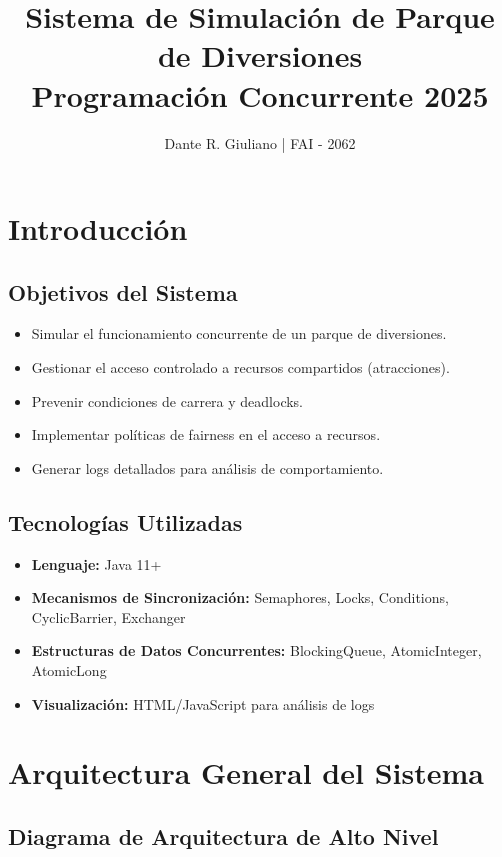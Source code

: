 \documentclass[12pt,a4paper]{article}
\title{\textbf{Sistema de Simulación de Parque de Diversiones }\\
\large Programación Concurrente 2025}
\author{Dante R. Giuliano | FAI - 2062}
\begin{document}
\maketitle
\newpage

\tableofcontents
\newpage

\section{Introducción}

\subsection{Objetivos del Sistema}
\begin{itemize}
    \item Simular el funcionamiento concurrente de un parque de diversiones.
    \item Gestionar el acceso controlado a recursos compartidos (atracciones).
    \item Prevenir condiciones de carrera y deadlocks.
    \item Implementar políticas de fairness en el acceso a recursos.
    \item Generar logs detallados para análisis de comportamiento.
\end{itemize}

\subsection{Tecnologías Utilizadas}
\begin{itemize}
    \item \textbf{Lenguaje:} Java 11+
    \item \textbf{Mecanismos de Sincronización:} Semaphores, Locks, Conditions, CyclicBarrier, Exchanger
    \item \textbf{Estructuras de Datos Concurrentes:} BlockingQueue, AtomicInteger, AtomicLong
    \item \textbf{Visualización:} HTML/JavaScript para análisis de logs
\end{itemize}

\newpage

\section{Arquitectura General del Sistema}

\subsection{Diagrama de Arquitectura de Alto Nivel}
\end{document}
